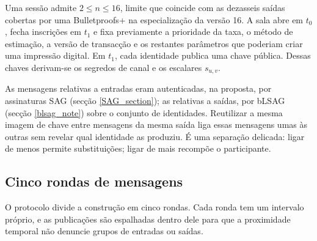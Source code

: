 Uma sessão admite \(2\leq n\leq16\), limite que coincide com as dezasseis
saídas cobertas por uma Bulletproofs+ na especialização da versão 16. A sala abre em
\(t_0\), fecha inscrições em \(t_1\) e fixa previamente a prioridade da taxa,
o método de estimação, a versão de transacção e os restantes parâmetros que
poderiam criar uma impressão digital. Em \(t_1\), cada identidade publica uma
chave pública. Dessas chaves derivam-se os segredos de canal e os escalares
\(s_{u,v}\).

As mensagens relativas a entradas eram autenticadas, na proposta, por
assinaturas SAG (secção \ref{SAG_section}); as relativas a saídas, por bLSAG
(secção \ref{blsag_note}) sobre o conjunto de identidades. Reutilizar a mesma
imagem de chave entre mensagens da mesma saída liga essas mensagens umas às
outras sem revelar qual identidade as produziu. É uma separação delicada:
ligar de menos permite substituições; ligar de mais recompõe o participante.

\subsection{Cinco rondas de mensagens}
\label{subsec:message-rounds-txtangle}

O protocolo divide a construção em cinco rondas. Cada ronda tem um
intervalo próprio, e as publicações são espalhadas dentro dele para que a
proximidade temporal não denuncie grupos de entradas ou saídas.

